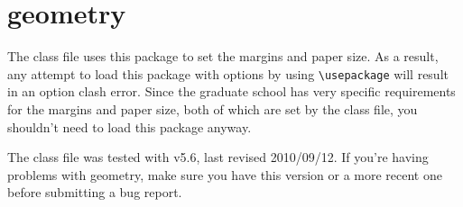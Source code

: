 \section{geometry}
The class file uses this package to set the margins and paper size.  As a result, any attempt to load this package with options by using \verb=\usepackage= will result in an option clash error.  Since the graduate school has very specific requirements for the margins and paper size, both of which are set by the class file, you shouldn't need to load this package anyway.

The class file was tested with v5.6, last revised 2010/09/12.  If you're having problems with geometry, make sure you have this version or a more recent one before submitting a bug report.
\endinput